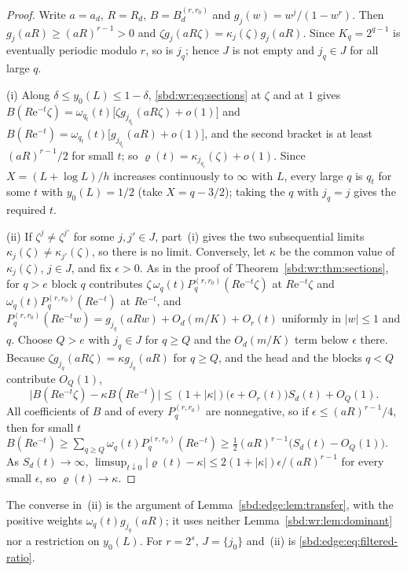 \documentclass[11pt,a4paper]{article}
\theoremstyle{definition}
\newcommand{\e}{\mathrm e}
\begin{document}
\begin{proof}
Write $a=a_d$, $R=R_d$, $B=B_d^{(r,r_0)}$ and $g_j(w)=w^j/(1-w^r)$. Then
$g_j(aR)\ge(aR)^{r-1}>0$ and $\zeta g_j(aR\zeta)=\kappa_j(\zeta)g_j(aR)$.
Since $K_q=2^{q-1}$ is eventually periodic modulo $r$, so is $j_q$; hence
$J$ is not empty and $j_q\in J$ for all large $q$.

(i) Along $\delta\le y_0(L)\le1-\delta$, \eqref{sbd:wr:eq:sections} at
$\zeta$ and at $1$ gives
$B(R\e^{-t}\zeta)=\omega_{q_t}(t)\bigl[\zeta g_{j_{q_t}}(aR\zeta)+o(1)\bigr]$
and $B(R\e^{-t})=\omega_{q_t}(t)\bigl[g_{j_{q_t}}(aR)+o(1)\bigr]$, and the
second bracket is at least $(aR)^{r-1}/2$ for small $t$; so
$\varrho(t)=\kappa_{j_{q_t}}(\zeta)+o(1)$. Since $X=(L+\log L)/h$ increases
continuously to $\infty$ with $L$, every large $q$ is $q_t$ for some $t$
with $y_0(L)=1/2$ (take $X=q-3/2$); taking the $q$ with $j_q=j$ gives the
required $t$.

(ii) If $\zeta^j\ne\zeta^{j'}$ for some $j,j'\in J$, part~(i) gives the two
subsequential limits $\kappa_j(\zeta)\ne\kappa_{j'}(\zeta)$, so there is no
limit. Conversely, let $\kappa$ be the common value of $\kappa_j(\zeta)$,
$j\in J$, and fix $\epsilon>0$. As in the proof of
Theorem~\ref{sbd:wr:thm:sections}, for $q>e$ block $q$ contributes
$\zeta\,\omega_q(t)P_q^{(r,r_0)}(R\e^{-t}\zeta)$ at $R\e^{-t}\zeta$ and
$\omega_q(t)P_q^{(r,r_0)}(R\e^{-t})$ at $R\e^{-t}$, and
$P_q^{(r,r_0)}(R\e^{-t}w)=g_{j_q}(aRw)+O_d(m/K)+O_r(t)$ uniformly in
$|w|\le1$ and $q$. Choose $Q>e$ with $j_q\in J$ for $q\ge Q$ and the
$O_d(m/K)$ term below $\epsilon$ there. Because
$\zeta g_{j_q}(aR\zeta)=\kappa g_{j_q}(aR)$ for $q\ge Q$, and the head and
the blocks $q<Q$ contribute $O_Q(1)$,
\[
 \bigl|B(R\e^{-t}\zeta)-\kappa B(R\e^{-t})\bigr|
 \le(1+|\kappa|)\bigl(\epsilon+O_r(t)\bigr)S_d(t)+O_Q(1).
\]
All coefficients of $B$ and of every $P_q^{(r,r_0)}$ are nonnegative, so
if $\epsilon\le(aR)^{r-1}/4$, then for small $t$
$B(R\e^{-t})\ge\sum_{q\ge Q}\omega_q(t)P_q^{(r,r_0)}(R\e^{-t})
\ge\tfrac12(aR)^{r-1}\bigl(S_d(t)-O_Q(1)\bigr)$. As $S_d(t)\to\infty$,
$\limsup_{t\downarrow0}|\varrho(t)-\kappa|\le2(1+|\kappa|)\epsilon/(aR)^{r-1}$
for every small $\epsilon$, so $\varrho(t)\to\kappa$.
\end{proof}
The converse in~(ii) is the argument of Lemma~\ref{sbd:edge:lem:transfer},
with the positive weights $\omega_q(t)g_{j_q}(aR)$; it uses neither
Lemma~\ref{sbd:wr:lem:dominant} nor a restriction on $y_0(L)$. For
$r=2^s$, $J=\{j_0\}$ and~(ii) is \eqref{sbd:edge:eq:filtered-ratio}.
\end{document}
